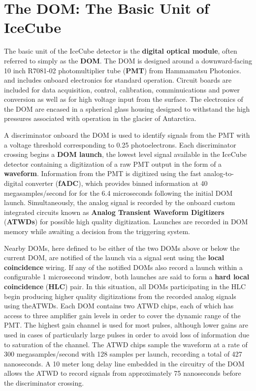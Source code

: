 \section{The DOM: The Basic Unit of IceCube}
The basic unit of the IceCube detector is the \textbf{digital optical module}, often referred to simply as the \textbf{DOM}.
The DOM is designed around a downward-facing 10 inch R7081-02 photomultiplier tube (\textbf{PMT}) from Hammamatsu Photonics.  and includes onboard electronics for standard operation. 
Circuit boards are included for data acquisition, control, calibration, comminuications and power conversion as well as for high voltage input from the surface.
The electronics of the DOM are encased in a spherical glass housing designed to withstand the high pressures associated with operation in the glacier of Antarctica.

A discriminator onboard the DOM is used to identify signals from the PMT with a voltage threshold corresponding to 0.25 photoelectrons.
Each discriminator crossing begins a \textbf{DOM launch}, the lowest level signal available in the IceCube detector containing a digitization of a raw PMT output in the form of a \textbf{waveform}.
Information from the PMT is digitized using the fast analog-to-digital converter (\textbf{fADC}), which provides binned information at 40 megasamples/second for for the 6.4 microseconds following the initial DOM launch.
Simultaneously, the analog signal is recorded by the onboard custom integrated circuits known as \textbf{Analog Transient Waveform Digitizers} (\textbf{ATWDs}) for possible high quality digitization.
Launches are recorded in DOM memory while awaiting a decision from the triggering system.

Nearby DOMs, here defined to be either of the two DOMs above or below the current DOM, are notified of the launch via a signal sent using the \textbf{local coincidence} wiring.
If any of the notified DOMs also record a launch within a configurable 1 microsecond window, both launches are said to form a \textbf{hard local coincidence} (\textbf{HLC}) pair.
In this situation, all DOMs participating in the HLC begin producing higher quality digitizations from the recorded analog signals using theATWDs.
Each DOM contains two ATWD chips, each of which has access to three amplifier gain levels in order to cover the dynamic range of the PMT.
The highest gain channel is used for most pulses, although lower gains are used in cases of particularly large pulses in order to avoid loss of information due to saturation of the channel.
The ATWD chips sample the waveform at a rate of 300 megasamples/second with 128 samples per launch, recording a total of 427 nanoseconds.
A 10 meter long delay line embedded in the circuitry of the DOM allows the ATWD to record signals from approximately 75 nanoseconds before the discriminator crossing.

